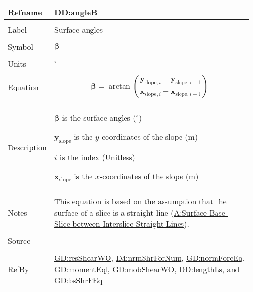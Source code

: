 \documentclass[12pt]{article}
\begin{document}
\vspace{\baselineskip}
\noindent
\begin{minipage}{\textwidth}
\begin{tabular}{>{\raggedright}p{}>{\raggedright\arraybackslash}p{}}
\toprule \textbf{Refname} & \textbf{DD:angleB}
\label{DD:angleB}
\\ \midrule \\
Label & Surface angles
        
\\ \midrule \\
Symbol & $\symbf{β}$
         
\\ \midrule \\
Units & ${{}^{\circ}}$
        
\\ \midrule \\
Equation & \begin{displaymath}
           \symbf{β}=\arctan\left(\frac{{\symbf{y}_{\text{slope},i}}-{\symbf{y}_{\text{slope},i-1}}}{{\symbf{x}_{\text{slope},i}}-{\symbf{x}_{\text{slope},i-1}}}\right)
           \end{displaymath}
\\ \midrule \\
Description & \begin{symbDescription}
              \item{$\symbf{β}$ is the surface angles (${{}^{\circ}}$)}
              \item{${\symbf{y}_{\text{slope}}}$ is the $y$-coordinates of the slope (${\text{m}}$)}
              \item{$i$ is the index (Unitless)}
              \item{${\symbf{x}_{\text{slope}}}$ is the $x$-coordinates of the slope (${\text{m}}$)}
              \end{symbDescription}
\\ \midrule \\
Notes & This equation is based on the assumption that the surface of a slice is a straight line (\hyperref[assumpSBSBISL]{A:Surface-Base-Slice-between-Interslice-Straight-Lines}).
        
\\ \midrule \\
Source & \cite{fredlund1977}
         
\\ \midrule \\
RefBy & \hyperref[GD:resShearWO]{GD:resShearWO}, \hyperref[IM:nrmShrForNum]{IM:nrmShrForNum}, \hyperref[GD:normForcEq]{GD:normForcEq}, \hyperref[GD:momentEql]{GD:momentEql}, \hyperref[GD:mobShearWO]{GD:mobShearWO}, \hyperref[DD:lengthLs]{DD:lengthLs}, and \hyperref[GD:bsShrFEq]{GD:bsShrFEq}
        
\\ \bottomrule
\end{tabular}
\end{minipage}
\end{document}
